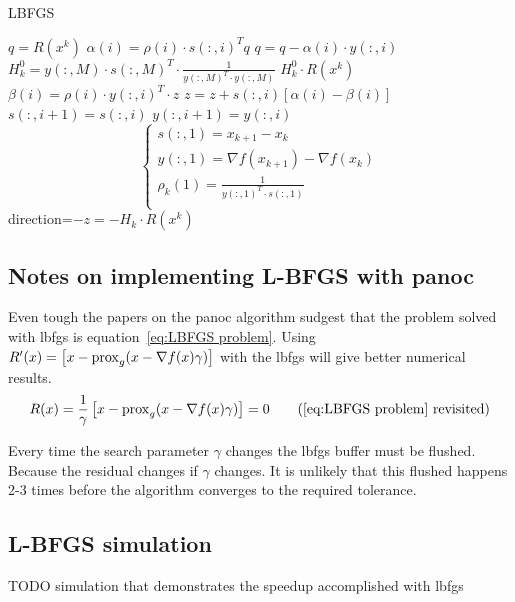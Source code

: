 		\begin{algorithm}
			\caption{LBFGS}
			\label{alg:LBFGS}
			\begin{algorithmic}[1]
				\State $q = R(x^k)$
				\State $\alpha(i)=\rho(i) \cdot s(:,i)^Tq$
				\State $q = q - \alpha(i) \cdot y(:,i)$
				\EndFor
				\State $H_k^0 = y(:,M) \cdot s(:,M)^T \cdot  \frac{1}{y(:,M)^T \cdot y(:,M)}$
				\State $H^0_k \cdot R(x^k)$
				\State $\beta(i) = \rho(i) \cdot y(:,i)^T \cdot z$
				\State $z = z + s(:,i)[\alpha(i)-\beta(i)]$
				\EndFor
				\State $s(:,i+1)=s(:,i)$
				\State $y(:,i+1)=y(:,i)$
				\EndFor
				\State $$\begin{cases}
				s(:,1) = x_{k+1} - x_k \\
				y(:,1) = \nabla f(x_{k+1}) - \nabla f(x_k)\\
				\rho_k(1) = \frac{1}{y(:,1)^T \cdot s(:,1)} \\ 
				\end{cases}
				$$
				\State \Return direction=$-z=-H_k \cdot R(x^k)$
				\EndProcedure
			\end{algorithmic}
		\end{algorithm}
	
	\subsection{Notes on implementing L-BFGS with panoc}
	Even tough the papers on the panoc algorithm sudgest that the problem solved with lbfgs is equation~\ref{eq:LBFGS problem}. Using $R'(x) = \left[ x - \operatorname{prox}_g( x - \nabla f(x)\gamma) \right]$ with the lbfgs will give better numerical results.
	\begin{equation}
	R(x) = \frac{1}{\gamma}\left[ x - \prox_g( x - \nabla f(x)\gamma) \right] = 0
	\tag{\ref{eq:LBFGS problem} revisited}
	\end{equation}
	
	Every time the search parameter $\gamma$ changes the lbfgs buffer must be flushed. Because the residual changes if $\gamma$ changes. It is unlikely that this flushed happens 2-3 times before the algorithm  converges to the required tolerance. 
	\subsection{L-BFGS simulation}
	TODO simulation that demonstrates the speedup accomplished with lbfgs